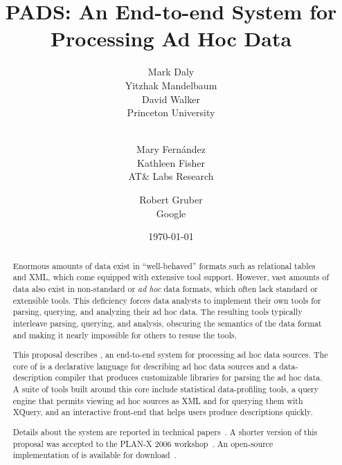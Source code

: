 \documentclass{sig-alternate-sigmod06}
\title{PADS: An End-to-end System for Processing Ad Hoc Data}
\author{Mark Daly\\Yitzhak Mandelbaum\\David Walker\\
       {Princeton University}\\
       {\mono{mdaly@princeton.edu}}\\{\mono{\{yitzhakm,dpw\}@cs.princeton.edu}}
\and Mary Fern\'andez\\Kathleen Fisher\\
       {AT\& Labs Research}\\
       {\mono{\{mff,kfisher\}@research.att.com}}
\and   {Robert Gruber\titlenote{Work conducted while at AT\&T
                                     Labs Research.}}\\
       {Google}\\
       {\mono{gruber@google.com}}}
\date{\today}
\begin{document}
\maketitle
\begin{abstract}
Enormous amounts of data exist in ``well-behaved'' formats such as
relational tables and XML, which come equipped with extensive tool
support.  However, vast amounts of data also exist in non-standard or
\textit{ad hoc} data formats, which often lack standard or extensible
tools. This deficiency forces data analysts to implement
their own tools for parsing, querying, and analyzing their ad hoc
data.  The resulting tools typically interleave parsing, querying, and
analysis, obscuring the semantics of the data format and making it
nearly impossible for others to resuse the tools.

This proposal describes \pads{}, an end-to-end system for processing
ad hoc data sources.  The core of \pads{} is a declarative
language for describing ad hoc data sources and a data-description
compiler that produces customizable libraries for parsing the ad hoc
data.  A suite of tools built around this core include statistical
data-profiling tools, a query engine that permits viewing ad hoc
sources as XML and for querying them with XQuery, and an interactive
front-end that helps users produce \pads{} descriptions quickly.

Details about the \pads{} system are reported in technical
papers~\cite{fernandez+:padx,fisher+:pldi05,fisher+:popl06}.  A
shorter version of this proposal was accepted to the PLAN-X 2006
workshop~\cite{daly+:launchpads}.  An open-source implementation of
\pads{} is available for download~\cite{padsmanual}.
\end{abstract}



% 



{\small
}
\end{document}
